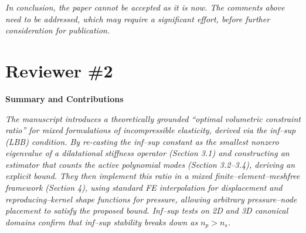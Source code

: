 \documentclass{article}
\begin{document}
 
\textit{In conclusion, the paper cannot be accepted as it is now. The comments above need to be addressed, which may require a significant effort, before further consideration for publication.}




\section*{Reviewer \#2}
\textbf{Summary and Contributions}

\textit{The manuscript introduces a theoretically grounded “optimal volumetric constraint ratio” for mixed formulations of incompressible elasticity, derived via the inf–sup (LBB) condition. By re-casting the inf–sup constant as the smallest nonzero eigenvalue of a dilatational stiffness operator (Section 3.1) and constructing an estimator that counts the active polynomial modes (Section 3.2–3.4), deriving an explicit bound. They then implement this ratio in a mixed finite–element–meshfree framework (Section 4), using standard FE interpolation for displacement and reproducing–kernel shape functions for pressure, allowing arbitrary pressure–node placement to satisfy the proposed bound. Inf–sup tests on 2D and 3D canonical domains confirm that inf–sup stability breaks down
as $n_p > n_s$.}
\end{document}
